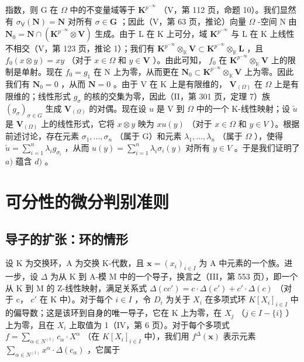 指数，则 G 在 \(\Omega\) 中的不变量域等于 \(\mathbf{K}^{p^{-\infty}}\) （V，第 112 页，命题 10）。我们显然有 \(\sigma_{\mathsf{V}}(\mathbf{N}) = \mathbf{N}\) 对所有 \(\sigma \in \mathbf{G}\) ；因此（V，第 63 页，推论）向量 \(\Omega\) -空间 N 由 \(\mathbf{N}_0 = \mathbf{N} \cap (\mathbf{K}^{p^{-\infty}} \otimes \mathbf{V})\) 生成。由于 L 在 K 上可分，域 \(\mathbf{K}^{p^{-\infty}}\) 与 L 在 K 上线性不相交（V，第 123 页，推论 1）；我们有 \(\mathbf{K}^{p^{-\infty}} \otimes_{\mathbb{K}} \mathbf{V} \subset \mathbf{K}^{p^{-\infty}} \otimes_{\mathbb{K}} \mathbf{L}\) ，且 \(f_0(x \otimes y) = xy\) （对于 \(x \in \Omega\) 和 \(y \in \mathbf{V}\) ）。由此可知， \(f_0\) 在 \(\mathbf{K}^{p^{-\infty}} \otimes_{\mathbb{K}} \mathbf{V}\) 上的限制是单射。现在 \(f_0 = g_1\) 在 N 上为零，从而更在 \(\mathbf{N}_0 \subset \mathbf{K}^{p^{-\infty}} \otimes_{\mathbb{K}} \mathbf{V}\) 上为零。因此我们有 \(\mathbf{N}_0 = 0\) ，从而 \(\mathbf{N} = 0\) 。由于 V 在 K 上是有限维的， \(\mathbf{V}_{(\Omega)}\) 在 \(\Omega\) 上是有限维的；线性形式 \(g_\sigma\) 的核的交集为零，因此（II，第 301 页，定理 7）族 \((g_\sigma)_{\sigma \in G}\) 生成 \(\mathbf{V}_{(\Omega)}\) 的对偶。现在设 \(u\) 是 V 到 \(\Omega\) 中的一个 K-线性映射；设 \(\tilde{u}\) 是 \(\mathbf{V}_{(\Omega)}\) 上的线性形式，它将 \(x \otimes y\) 映为 \(x u(y)\) （对于 \(x \in \Omega\) 和 \(y \in V\) ）。根据前述讨论，存在元素 \(\sigma_1, ..., \sigma_n\) （属于 G）和元素 \(\lambda_1, ..., \lambda_n\) （属于 \(\Omega\) ），使得 \(\tilde{u} = \sum_{i=1}^{n} \lambda_i g_{\sigma_i}\) ，从而 \(u(y) = \sum_{i=1}^{n} \lambda_i \sigma_i(y)\) 对所有 \(y \in V\) 。于是我们证明了 \(a)\) 蕴含 \(d)\) 。

\section{可分性的微分判别准则}

\subsection{导子的扩张：环的情形}

设 K 为交换环，A 为交换 K-代数，且 \(\mathbf{x} = (x_i)_{i \in I}\) 为 A 中元素的一个族。进一步，设 \(\Delta\) 为从 K 到 A-模 M 中的一个导子，换言之（III，第 553 页），即一个从 K 到 M 的 Z-线性映射，满足关系式 \(\Delta(cc') = c \cdot \Delta(c') + c' \cdot \Delta(c)\) （对于 c， \(c'\) 在 K 中）。对于每个 \(i \in I\) ，令 \(D_i\) 为关于 \(X_i\) 在多项式环 \(K[X_i]_{i \in I}\) 中的偏导数；这是该环到自身的唯一导子，它在 K 上为零，在 \(X_j\) （\(j \in I - \{i\}\) ）上为零，且在 \(X_i\) 上取值为 1（IV，第 6 页）。对于每个多项式 \(f = \sum_{\alpha \in N^{(1)}} c_\alpha \cdot X^\alpha\) （在 \(K[X_i]_{i \in I}\) 中），我们用 \(f^\Delta(\mathbf{x})\) 表示元素 \(\sum_{\alpha \in N^{(1)}} x^\alpha \cdot \Delta(c_\alpha)\) ，它属于

